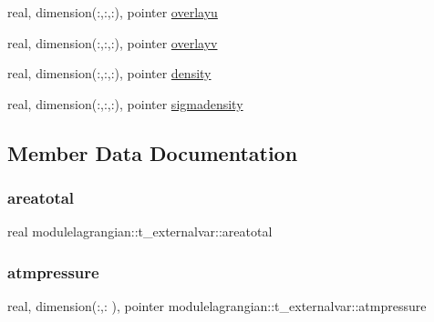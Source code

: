 \begin{DoxyCompactItemize}
\item 
real, dimension(\+:,\+:,\+:), pointer \mbox{\hyperlink{structmodulelagrangian_1_1t__externalvar_abd10b7d586b0ceb731f90451e17ba559}{overlayu}}
\item 
real, dimension(\+:,\+:,\+:), pointer \mbox{\hyperlink{structmodulelagrangian_1_1t__externalvar_a9881d9af87994ce4999983f0f11d117b}{overlayv}}
\item 
real, dimension(\+:,\+:,\+:), pointer \mbox{\hyperlink{structmodulelagrangian_1_1t__externalvar_a208a587f040a146b97e8109e1e7b530a}{density}}
\item 
real, dimension(\+:,\+:,\+:), pointer \mbox{\hyperlink{structmodulelagrangian_1_1t__externalvar_a64331288eb1bd9212e7bfbd7583ce36d}{sigmadensity}}
\end{DoxyCompactItemize}


\subsection{Member Data Documentation}
\mbox{\label{structmodulelagrangian_1_1t__externalvar_a67d3f346a03b5546e153049f93fae25d}} 
\subsubsection{\texorpdfstring{areatotal}{areatotal}}
{\footnotesize\ttfamily real modulelagrangian\+::t\+\_\+externalvar\+::areatotal\hspace{0.3cm}{\ttfamily [private]}}

\mbox{\label{structmodulelagrangian_1_1t__externalvar_a67aed9410eca1243792237d1f13de75d}} 
\subsubsection{\texorpdfstring{atmpressure}{atmpressure}}
{\footnotesize\ttfamily real, dimension(\+:,\+:  ), pointer modulelagrangian\+::t\+\_\+externalvar\+::atmpressure\hspace{0.3cm}{\ttfamily [private]}}

